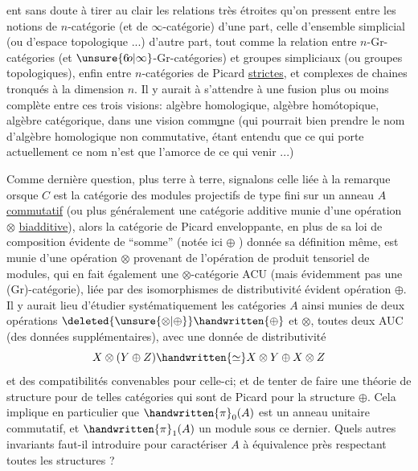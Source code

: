 
ent sans doute à tirer au clair les relations très étroites qu'on pressent entre les notions de $n$-catégorie (et de $\infty$-catégorie) d'une part, celle d'ensemble simplicial (ou d'espace topologique ...) d'autre part, tout comme la relation entre $n$-Gr-catégories (et $\unsure{6\!o|\infty}$-Gr-catégories) et groupes simpliciaux (ou groupes topologiques), enfin entre   $n$-catégories de Picard \uline{strictes}, et  complexes de chaines tronqués à la dimension $n$. Il y aurait à s'attendre à une fusion plus ou moins complète entre ces trois visions: algèbre homologique, algèbre homótopique, algèbre catégorique, dans une vision comm\uline{u}ne (qui pourrait bien prendre le nom d'algèbre homologique non commutative, étant entendu que ce qui porte actuellement ce nom n'est que l'amorce de ce qui   venir ...)

Comme dernière question, plus terre à terre, signalons celle liée à la remarque   orsque  $C$ est la catégorie des modules projectifs de type fini sur un anneau $A$ \uline{commutatif} (ou plus généralement une catégorie additive munie d'une opération $\otimes$   \uline{biadditive}), alors la catégorie de Picard enveloppante, en plus de sa loi de composition évidente de ``somme'' (notée ici $\oplus$ ) donnée   sa définition même, est munie d'une opération $\otimes$ provenant de l'opération de produit tensoriel  de modules, qui en fait également une $\otimes$-catégorie ACU (mais évidemment pas une (Gr)-catégorie), liée par des isomorphismes de distributivité évident   opération $\oplus$. Il y aurait lieu d'étudier systématiquement les catégories $A$ ainsi munies de deux opérations $\deleted{\unsure{\otimes|\oplus}}\handwritten{\oplus}$ et $\otimes$, toutes deux AUC (des données supplémentaires), avec une donnée de distributivité
\[
X\otimes(Y\oplus Z)\handwritten{\simeq}X\otimes Y\oplus X\otimes Z
\]
et des compatibilités convenables pour celle-ci; et de tenter de faire une théorie de structure pour de telles catégories qui sont de  Picard pour la structure $\oplus$. Cela implique en particulier que $\handwritten{\pi}_{0}(A)$ est un anneau unitaire commutatif, et $\handwritten{\pi}_{1}(A)$ un module sous ce dernier. Quels autres invariants faut-il introduire pour caractériser $A$ à équivalence près respectant toutes les structures ?

